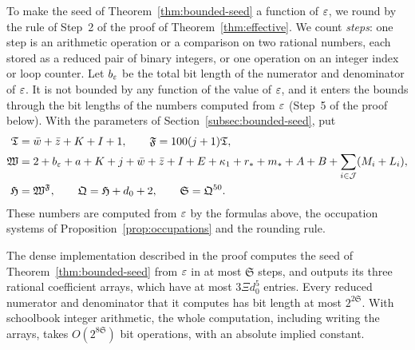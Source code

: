 To make the seed of Theorem~\ref{thm:bounded-seed} a function of
\(\varepsilon\), we round by the rule of Step~2 of the proof of
Theorem~\ref{thm:effective}. We count \emph{steps}: one step is an
arithmetic operation or a comparison on two rational numbers, each
stored as a reduced pair of binary integers, or one operation on an
integer index or loop counter. Let \(b_\varepsilon\) be the total bit
length of the numerator and denominator of \(\varepsilon\). It is not bounded
by any function of the value of \(\varepsilon\), and it enters the bounds
through the bit lengths of the numbers computed from \(\varepsilon\) (Step~5
of the proof below). With the
parameters of Section~\ref{subsec:bounded-seed}, put
\begin{align*}
 \mathfrak T&=\bar w+\bar z+K+I+1,\qquad
 \mathfrak F=100(j+1)\mathfrak T,\\
 \mathfrak W&=2+b_\varepsilon+a+K+j+\bar w+\bar z+I+E+\kappa_1
       +r_*+m_*+A+B+\sum_{i\in\mathcal J}(M_i+L_i),\\
 \mathfrak H&=\mathfrak W^{\mathfrak F},\qquad
 \mathfrak Q=\mathfrak H+d_0+2,\qquad
 \mathfrak S=\mathfrak Q^{50}.
\end{align*}
These numbers are computed from \(\varepsilon\) by the formulas above, the
occupation systems of Proposition~\ref{prop:occupations} and the
rounding rule.

\begin{theorem}\label{thm:construction-resources}
The dense implementation described in the proof computes the seed of
Theorem~\ref{thm:bounded-seed} from \(\varepsilon\) in at most
\(\mathfrak S\) steps, and outputs its three rational coefficient
arrays, which have at most \(3\Xi d_0^5\) entries. Every reduced
numerator and denominator that it computes has bit length at most
\(2^{2\mathfrak S}\). With schoolbook integer arithmetic, the whole
computation, including writing the arrays, takes
\(O(2^{8\mathfrak S})\) bit operations, with an absolute implied
constant.
\end{theorem}


